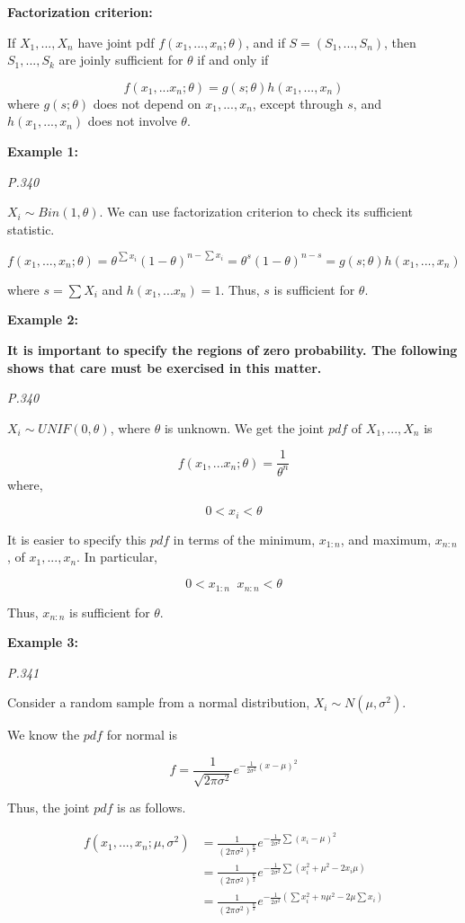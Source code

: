 \documentclass[]{book}
\begin{document}
\textbf{Factorization criterion:}

If \(X_1,...,X_n\) have joint pdf \(f(x_1,...,x_n; \theta)\), and if \(S=(S_1,...,S_n)\), then \(S_1,...,S_k\) are joinly sufficient for \(\theta\) if and only if

\[f(x_1,...x_n; \theta)=g(s;\theta)h(x_1,...,x_n)\]
where \(g(s;\theta)\) does not depend on \(x_1,...,x_n\), except through \(s\), and \(h(x_1,...,x_n)\) does not involve \(\theta\).

\textbf{Example 1:}

\emph{P.340}

\(X_i \sim Bin(1,\theta)\). We can use factorization criterion to check its sufficient statistic.

\[f(x_1,...,x_n;\theta)=\theta^{\sum x_i}(1-\theta)^{n-\sum x_i}=\theta^s(1-\theta)^{n-s}=g(s;\theta)h(x_1,...,x_n)\]

where \(s=\sum X_i\) and \(h(x_1,...x_n)=1\). Thus, \(s\) is sufficient for \(\theta\).

\textbf{Example 2:}

\textbf{It is important to specify the regions of zero probability. The following shows that care must be exercised in this matter.}

\emph{P.340}

\(X_i \sim UNIF(0,\theta)\), where \(\theta\) is unknown. We get the joint \(pdf\) of \(X_1,...,X_n\) is

\[f(x_1,...x_n; \theta)=\frac{1}{\theta^n}\]
where,

\[0<x_i<\theta\]

It is easier to specify this \(pdf\) in terms of the minimum, \(x_{1:n}\), and maximum, \(x_{n:n}\), of \(x_1,...,x_n\). In particular,

\[0< x_{1:n}  \; \; x_{n:n} <\theta\]

Thus, \(x_{n:n}\) is sufficient for \(\theta\).

\textbf{Example 3:}

\emph{P.341}

Consider a random sample from a normal distribution, \(X_i \sim N(\mu, \sigma^2)\).

We know the \(pdf\) for normal is

\[f=\frac{1}{\sqrt{2\pi \sigma^2 }} e^{-\frac{1}{2\sigma^2}(x-\mu)^2}\]

Thus, the joint \(pdf\) is as follows.

\[\begin{aligned} f(x_1,...,x_n;\mu,\sigma^2) &=\frac{1}{(2\pi\sigma^2)^{\frac{n}{2}}}e^{-\frac{1}{2\sigma^2}\sum (x_i-\mu)^2} \\ &=\frac{1}{(2\pi\sigma^2)^{\frac{n}{2}}}e^{-\frac{1}{2\sigma^2}\sum (x_i^2+\mu^2-2x_i\mu)} \\ &=\frac{1}{(2\pi\sigma^2)^{\frac{n}{2}}}e^{-\frac{1}{2\sigma^2}(\sum x_i^2+n\mu^2-2\mu\sum x_i)} \end{aligned}\]
\end{document}
